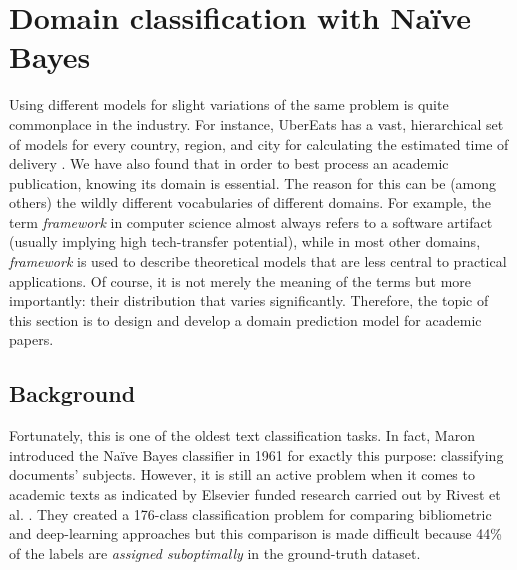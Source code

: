 \section{Domain classification with Naïve Bayes} \label{section:simple-case}

Using different models for slight variations of the same problem is quite commonplace in the industry. For instance, UberEats has a vast, hierarchical set of models for every country, region, and city for calculating the estimated time of delivery \cite{li2017scaling}. We have also found that in order to best process an academic publication, knowing its domain is essential. The reason for this can be (among others) the wildly different vocabularies of different domains. For example, the term \textit{framework} in computer science almost always refers to a software artifact (usually implying high tech-transfer potential), while in most other domains, \textit{framework} is used to describe theoretical models that are less central to practical applications. Of course, it is not merely the meaning of the terms but more importantly: their distribution that varies significantly. Therefore, the topic of this section is to design and develop a domain prediction model for academic papers.

\subsection{Background}

Fortunately, this is one of the oldest text classification tasks. In fact, Maron introduced the Naïve Bayes classifier in 1961 \cite{maron1961automatic} for exactly this purpose: classifying documents' subjects. However, it is still an active problem when it comes to academic texts as indicated by Elsevier funded research carried out by Rivest et al. \cite{rivest2021level}. They created a 176-class classification problem for comparing bibliometric and deep-learning approaches but this comparison is made difficult because 44\% of the labels are \textit{assigned suboptimally} in the ground-truth dataset.

